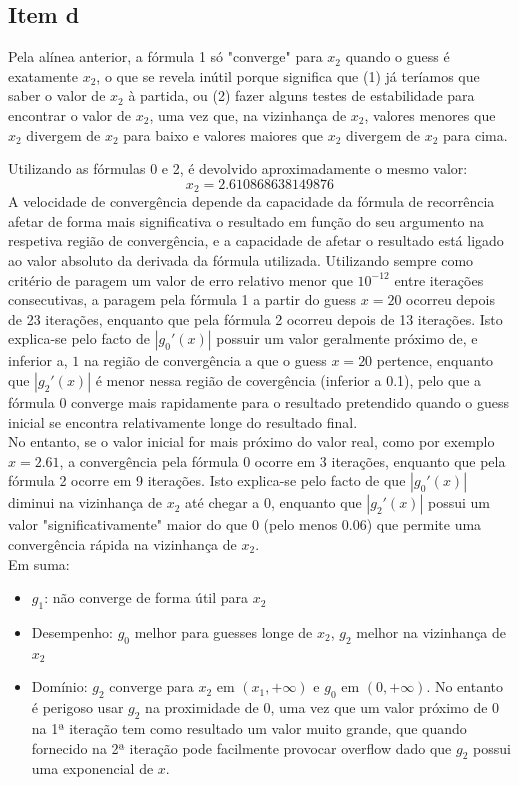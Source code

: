 {\subsection{Item d}
Pela alínea anterior, a fórmula 1 só "converge" para $x_2$ quando o guess é exatamente $x_2$, o que se revela inútil porque significa que (1) já teríamos que saber o valor de $x_2$ à partida, ou (2) fazer alguns testes de estabilidade para encontrar o valor de $x_2$, uma vez que, na vizinhança de $x_2$, valores menores que $x_2$ divergem de $x_2$ para baixo e valores maiores que $x_2$ divergem de $x_2$ para cima.

Utilizando as fórmulas 0 e 2, é devolvido aproximadamente o mesmo valor:
\begin{equation*}
	x_2 = 2.610868638149876
\end{equation*}
A velocidade de convergência depende da capacidade da fórmula de recorrência afetar de forma mais significativa o resultado em função do seu argumento na respetiva região de convergência, e a capacidade de afetar o resultado está ligado ao valor absoluto da derivada da fórmula utilizada.
Utilizando sempre como critério de paragem um valor de erro relativo menor que $10^{-12}$ entre iterações consecutivas, a paragem pela fórmula 1 a partir do guess $x=20$ ocorreu depois de 23 iterações, enquanto que pela fórmula 2 ocorreu depois de 13 iterações. Isto explica-se pelo facto de $|g_0'(x)|$ possuir um valor geralmente próximo de, e inferior a, $1$ na região de convergência a que o guess $x=20$ pertence, enquanto que $|g_2'(x)|$ é menor nessa região de covergência (inferior a 0.1), pelo que a fórmula 0 converge mais rapidamente para o resultado pretendido quando o guess inicial se encontra relativamente longe do resultado final.\\
No entanto, se o valor inicial for mais próximo do valor real, como por exemplo $x=2.61$, a convergência pela fórmula 0 ocorre em 3 iterações, enquanto que pela fórmula 2 ocorre em 9 iterações. Isto explica-se pelo facto de que $|g_0'(x)|$ diminui na vizinhança de $x_2$ até chegar a $0$, enquanto que $|g_2'(x)|$ possui um valor "significativamente" maior do que $0$ (pelo menos 0.06) que permite uma convergência rápida na vizinhança de $x_2$.\\
Em suma:
\begin{itemize}
	\item $g_1$: não converge de forma útil para $x_2$
	\item Desempenho: $g_0$ melhor para guesses longe de $x_2$, $g_2$ melhor na vizinhança de $x_2$
	\item Domínio: $g_2$ converge para $x_2$ em $(x_1,+\infty)$ e $g_0$ em $(0,+\infty)$. No entanto é perigoso usar $g_2$ na proximidade de $0$, uma vez que um valor próximo de $0$ na 1ª iteração tem como resultado um valor muito grande, que quando fornecido na 2ª iteração pode facilmente provocar overflow dado que $g_2$ possui uma exponencial de $x$.
\end{itemize}
}
